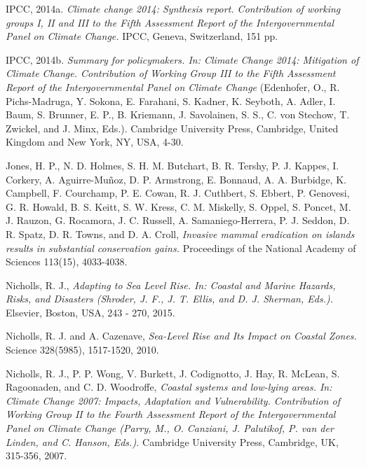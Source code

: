 \documentclass{article} %
\begin{document}
\begin{thebibliography}{10}
\hypertarget{ipcc}{}	 
IPCC, 2014a.
\textit{Climate change 2014: Synthesis report. Contribution of working groups I, II and III to the Fifth Assessment Report of the Intergovernmental Panel on Climate Change.} 
IPCC, Geneva, Switzerland, 151 pp.

\hypertarget{ipcc2}{}	 
IPCC, 2014b.
\textit{Summary for policymakers. In: Climate Change 2014: Mitigation of
Climate Change. Contribution of Working Group III to the Fifth Assessment
Report of the Intergovernmental Panel on Climate Change} 
(Edenhofer, O., R.
Pichs-Madruga, Y. Sokona, E. Farahani, S. Kadner, K. Seyboth, A. Adler, I.
Baum, S. Brunner, E. P., B. Kriemann, J. Savolainen, S. S., C. von Stechow,
T. Zwickel, and J. Minx, Eds.). Cambridge University Press, Cambridge, United
Kingdom and New York, NY, USA, 4-30.


\hypertarget{jones}{}	 
Jones, H. P., N. D. Holmes, S. H. M. Butchart, B. R. Tershy, P. J. Kappes, I. Corkery,
A. Aguirre-Muñoz, D. P. Armstrong, E. Bonnaud, A. A. Burbidge, K. Campbell,
F. Courchamp, P. E. Cowan, R. J. Cuthbert, S. Ebbert, P. Genovesi, G. R.
Howald, B. S. Keitt, S. W. Kress, C. M. Miskelly, S. Oppel, S. Poncet, M. J.
Rauzon, G. Rocamora, J. C. Russell, A. Samaniego-Herrera, P. J. Seddon, D.
R. Spatz, D. R. Towns, and D. A. Croll,
\textit{Invasive mammal eradication on islands results in substantial conservation gains.} Proceedings of the National Academy of Sciences 113(15), 4033-4038.

\hypertarget{nicholls}{}	 
Nicholls, R. J.,
\textit{Adapting to Sea Level Rise. In: Coastal and Marine Hazards, Risks, and Disasters (Shroder, J. F., J. T. Ellis, and D. J. Sherman, Eds.).} 
Elsevier, Boston, USA, 243 - 270, 2015.

\hypertarget{nicholls2}{}	 
Nicholls, R. J. and A. Cazenave,
\textit{Sea-Level Rise and Its Impact on Coastal Zones.} 
Science 328(5985), 1517-1520, 2010.

\hypertarget{nicholls3}{}	 
Nicholls, R. J., P. P. Wong, V. Burkett, J. Codignotto, J. Hay, R. McLean, S.
Ragoonaden, and C. D. Woodroffe,
\textit{Coastal systems and low-lying areas.
In: Climate Change 2007: Impacts, Adaptation and Vulnerability. Contribution
of Working Group II to the Fourth Assessment Report of the Intergovernmental
Panel on Climate Change (Parry, M., O. Canziani, J. Palutikof, P. van der
Linden, and C. Hanson, Eds.).} 
Cambridge University Press, Cambridge, UK, 315-356, 2007.


\end{thebibliography}
\end{document}
